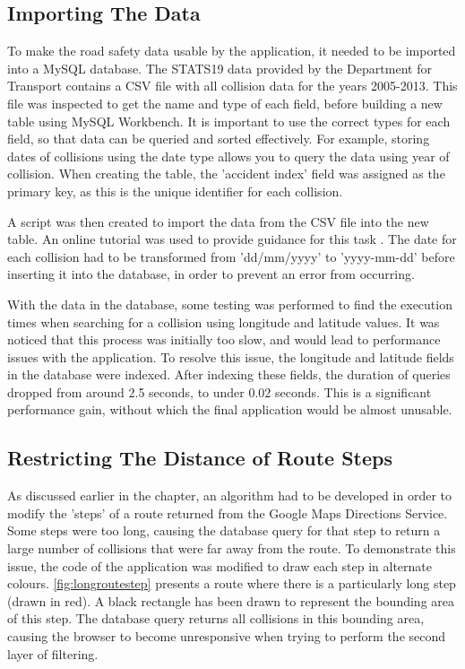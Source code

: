\documentclass[authoryearcitations]{UoYCSproject}
\begin{document}
\subsection{Importing The Data}

To make the road safety data usable by the application, it needed to be imported into a MySQL database. The STATS19 data provided by the Department for Transport contains a CSV file with all collision data for the years 2005-2013. This file was inspected to get the name and type of each field, before building a new table using MySQL Workbench. It is important to use the correct types for each field, so that data can be queried and sorted effectively. For example, storing dates of collisions using the date type allows you to query the data using year of collision. When creating the table, the 'accident index' field was assigned as the primary key, as this is the unique identifier for each collision.

A script was then created to import the data from the CSV file into the new table. An online tutorial was used to provide guidance for this task \citep{MySQLTutorial}. The date for each collision had to be transformed from 'dd/mm/yyyy' to 'yyyy-mm-dd' before inserting it into the database, in order to prevent an error from occurring.

With the data in the database, some testing was performed to find the execution times when searching for a collision using longitude and latitude values. It was noticed that this process was initially too slow, and would lead to performance issues with the application. To resolve this issue, the longitude and latitude fields in the database were indexed. After indexing these fields, the duration of queries dropped from around 2.5 seconds, to under 0.02 seconds. This is a significant performance gain, without which the final application would be almost unusable.

\subsection{Restricting The Distance of Route Steps}
\label{sec:restrictAlgorithm}

As discussed earlier in the chapter, an algorithm had to be developed in order to modify the 'steps' of a route returned from the Google Maps Directions Service. Some steps were too long, causing the database query for that step to return a large number of collisions that were far away from the route. To demonstrate this issue, the code of the application was modified to draw each step in alternate colours. \autoref{fig:longroutestep} presents a route where there is a particularly long step (drawn in red). A black rectangle has been drawn to represent the bounding area of this step. The database query returns all collisions in this bounding area, causing the browser to become unresponsive when trying to perform the second layer of filtering. 
\end{document}
